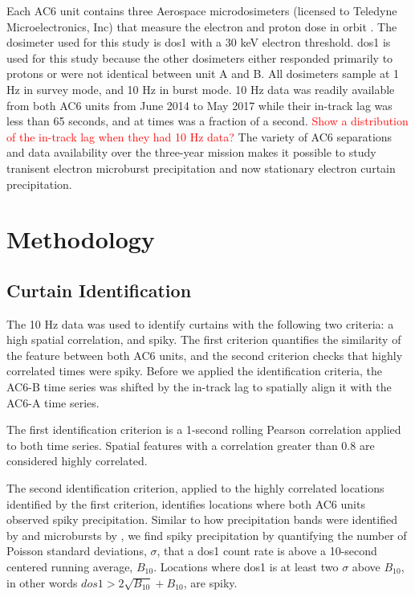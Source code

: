 \documentclass[draft]{agujournal2019}
\begin{document}
Each AC6 unit contains three Aerospace microdosimeters (licensed to Teledyne Microelectronics, Inc) that measure the electron and proton dose in orbit \cite{O'brien2016}. The dosimeter used for this study is dos1 with a $30$ keV electron threshold. dos1 is used for this study because the other dosimeters either responded primarily to protons or were not identical between unit A and B. All dosimeters sample at 1 Hz in survey mode, and 10 Hz in burst mode. 10 Hz data was readily available from both AC6 units from June 2014 to May 2017 while their in-track lag was less than 65 seconds, and at times was a fraction of a second. \textcolor{red}{Show a distribution of the in-track lag when they had 10 Hz data?} The variety of AC6 separations and data availability over the three-year mission makes it possible to study tranisent electron microburst precipitation \cite{Shumko2020} and now stationary electron curtain precipitation.

\section{Methodology} 
\subsection{Curtain Identification} \label{curtain_identification}
The 10 Hz data was used to identify curtains with the following two criteria: a high spatial correlation, and spiky. The first criterion quantifies the similarity of the feature between both AC6 units, and the second criterion checks that highly correlated times were spiky. Before we applied the identification criteria, the AC6-B time series was shifted by the in-track lag to spatially align it with the AC6-A time series. 

The first identification criterion is a 1-second rolling Pearson correlation applied to both time series. Spatial features with a correlation greater than 0.8 are considered highly correlated.

The second identification criterion, applied to the highly correlated locations identified by the first criterion, identifies locations where both AC6 units observed spiky precipitation. Similar to how precipitation bands were identified by  and microbursts by , we find spiky precipitation by quantifying the number of Poisson standard deviations, $\sigma$, that a dos1 count rate is above a 10-second centered running average, $B_{10}$. Locations where dos1 is at least two $\sigma$ above $B_{10}$, in other words $dos1 > 2\sqrt{B_{10}} + B_{10}$, are spiky. 
\end{document}
